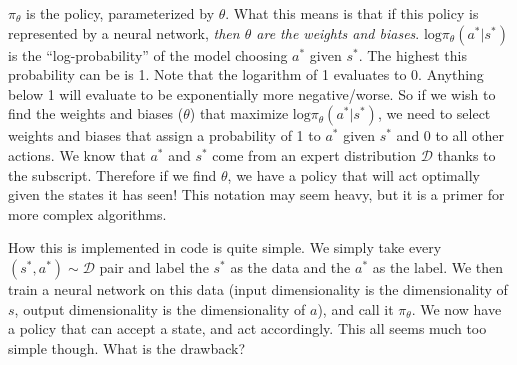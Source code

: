 \begin{flushleft}
   $\pi_\theta$ is the policy, parameterized by $\theta$. What this means is that if this policy is represented by a neural network, \textit{then $\theta$ are the weights and biases}. $\mathrm{log}\pi_\theta(a^*|s^*)$ is the ``log-probability'' of the model choosing $a^*$ given $s^*$. The highest this probability can be is 1. Note that the logarithm of 1 evaluates to 0. Anything below 1 will evaluate to be exponentially more negative/worse. So if we wish to find the weights and biases ($\theta$) that maximize $\mathrm{log}\pi_\theta(a^*|s^*)$, we need to select weights and biases that assign a probability of 1 to $a^*$ given $s^*$ and 0 to all other actions. We know that $a^*$ and $s^*$ come from an expert distribution $\mathcal{D}$ thanks to the subscript. Therefore if we find $\theta$, we have a policy that will act optimally given the states it has seen! This notation may seem heavy, but it is a primer for more complex algorithms. \break

   How this is implemented in code is quite simple. We simply take every $(s^*,a^*) \sim \mathcal{D}$ pair and label the $s^*$ as the data and the $a^*$ as the label. We then train a neural network on this data (input dimensionality is the dimensionality of $s$, output dimensionality is the dimensionality of $a$), and call it $\pi_\theta$. We now have a policy that can accept a state, and act accordingly. This all seems much too simple though. What is the drawback?
\end{flushleft}

